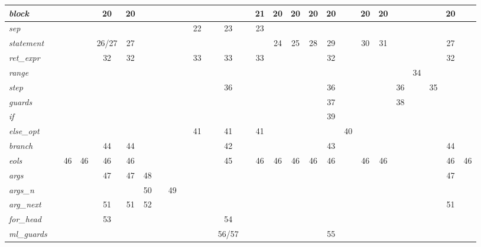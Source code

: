 \begin{tabular}{|l|c|c|c|c|c|c|c|c|c|c|c|c|c|c|c|c|c|c|c|c|c|c|c|c|c|c|}
\textit{block} &  &  &  & 20 & 20 &  &  &  &  &  &  &  &  & 21 & 20 & 20 & 20 & 20 &  & 20 & 20 &  &  &  & 20 &  \\ \hline
\textit{sep} &  &  &  &  &  &  &  &  &  & 22 &  & 23 &  & 23 &  &  &  &  &  &  &  &  &  &  &  &  \\ \hline
\textit{statement} &  &  &  & 26/27 & 27 &  &  &  &  &  &  &  &  &  & 24 & 25 & 28 & 29 &  & 30 & 31 &  &  &  & 27 &  \\ \hline
\textit{ret\_expr} &  &  &  & 32 & 32 &  &  &  &  & 33 &  & 33 &  & 33 &  &  &  & 32 &  &  &  &  &  &  & 32 &  \\ \hline\hline
\textit{range} &  &  &  &  &  &  &  &  &  &  &  &  &  &  &  &  &  &  &  &  &  &  & 34 &  &  &  \\ \hline
\textit{step} &  &  &  &  &  &  &  &  &  &  &  & 36 &  &  &  &  &  & 36 &  &  &  & 36 &  & 35 &  &  \\ \hline
\textit{guards} &  &  &  &  &  &  &  &  &  &  &  &  &  &  &  &  &  & 37 &  &  &  & 38 &  &  &  &  \\ \hline
\textit{if} &  &  &  &  &  &  &  &  &  &  &  &  &  &  &  &  &  & 39 &  &  &  &  &  &  &  &  \\ \hline
\textit{else\_opt} &  &  &  &  &  &  &  &  &  & 41 &  & 41 &  & 41 &  &  &  &  & 40 &  &  &  &  &  &  &  \\ \hline
\textit{branch} &  &  &  & 44 & 44 &  &  &  &  &  &  & 42 &  &  &  &  &  & 43 &  &  &  &  &  &  & 44 &  \\ \hline\hline
\textit{eols} &  & 46 & 46 & 46 & 46 &  &  &  &  &  &  & 45 &  & 46 & 46 & 46 & 46 & 46 &  & 46 & 46 &  &  &  & 46 & 46 \\ \hline
\textit{args} &  &  &  & 47 & 47 & 48 &  &  &  &  &  &  &  &  &  &  &  &  &  &  &  &  &  &  & 47 &  \\ \hline
\textit{args\_n} &  &  &  &  &  & 50 &  & 49 &  &  &  &  &  &  &  &  &  &  &  &  &  &  &  &  &  &  \\ \hline
\textit{arg\_next} &  &  &  & 51 & 51 & 52 &  &  &  &  &  &  &  &  &  &  &  &  &  &  &  &  &  &  & 51 &  \\ \hline
\hline
\textit{for\_head} &  &  &  & 53 &  &  &  &  &  &  &  & 54 &  &  &  &  &  &  &  &  &  &  &  &  &  &  \\ \hline
\textit{ml\_guards} &  &  &  &  &  &  &  &  &  &  &  & 56/57 &  &  &  &  &  & 55 &  &  &  &  &  &  &  &  \\ \hline
\end{tabular}
